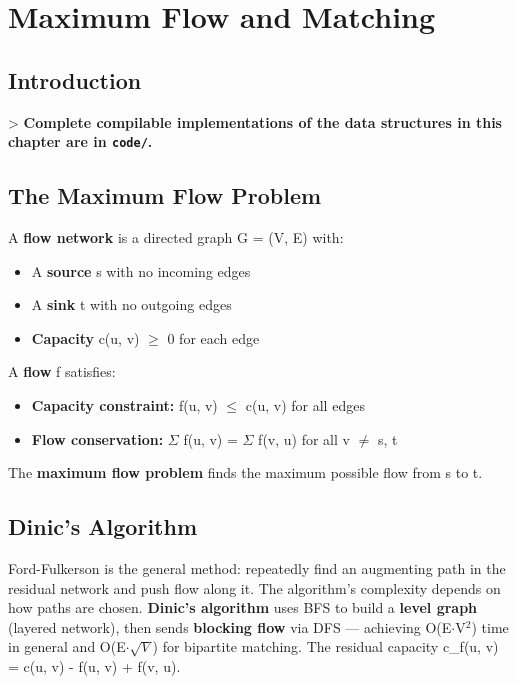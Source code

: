 \chapter{Maximum Flow and Matching}\label{ch20:maximum-flow-and-matching}

\section{Introduction}

> \textbf{Complete compilable implementations of the data structures in this chapter are in \texttt{code/}.}

\section{The Maximum Flow Problem}

A \textbf{flow network} is a directed graph G = (V, E) with:
\begin{itemize}
\item A \textbf{source} s with no incoming edges
\item A \textbf{sink} t with no outgoing edges
\item \textbf{Capacity} c(u, v) $\ge $ 0 for each edge
\end{itemize}

A \textbf{flow} f satisfies:
\begin{itemize}
\item \textbf{Capacity constraint:} f(u, v) $\le $ c(u, v) for all edges
\item \textbf{Flow conservation:} $\Sigma $ f(u, v) = $\Sigma $ f(v, u) for all v $\ne $ s, t
\end{itemize}

The \textbf{maximum flow problem} finds the maximum possible flow from s to t.

\section{Dinic's Algorithm}

Ford-Fulkerson is the general method: repeatedly find an augmenting path in the residual network and push flow along it. The algorithm's complexity depends on how paths are chosen. \textbf{Dinic's algorithm} uses BFS to build a \textbf{level graph} (layered network), then sends \textbf{blocking flow} via DFS — achieving O(E$\cdot $V$^{2}$) time in general and O(E$\cdot $$\sqrt {V}$) for bipartite matching. The residual capacity c\_f(u, v) = c(u, v) - f(u, v) + f(v, u).

